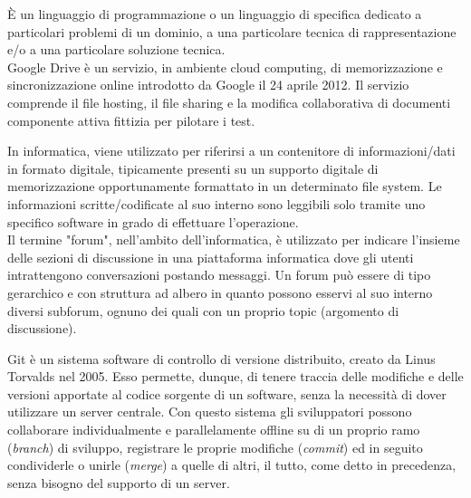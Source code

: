 \documentclass{scalatekids-article}
\begin{document}
 È un linguaggio di programmazione o un linguaggio di specifica dedicato a particolari problemi di un dominio, a una particolare tecnica di rappresentazione e/o a una particolare soluzione tecnica.
\\

 Google Drive è un servizio, in ambiente cloud computing, di memorizzazione e sincronizzazione online introdotto da Google il 24 aprile 2012. Il servizio comprende il file hosting, il file sharing e la modifica collaborativa di documenti
\\

 componente attiva fittizia per pilotare i test.
\\



 In informatica, viene utilizzato per riferirsi a un contenitore di informazioni/dati in formato digitale, tipicamente presenti su un supporto digitale di memorizzazione opportunamente formattato in un determinato file system.
Le informazioni scritte/codificate al suo interno sono leggibili solo tramite uno specifico software in grado di effettuare l'operazione.
\\

 Il termine "forum", nell'ambito dell'informatica, è utilizzato per indicare l'insieme delle sezioni di discussione in una piattaforma informatica dove gli utenti intrattengono conversazioni postando messaggi.
Un forum può essere di tipo gerarchico e con struttura ad albero in quanto possono esservi al suo interno diversi subforum, ognuno dei quali con un proprio topic (argomento di discussione).
\\


 Git è un sistema software di controllo di versione distribuito, creato da Linus Torvalds nel 2005.
Esso permette, dunque, di tenere traccia delle modifiche e delle versioni apportate al codice sorgente di un software, senza la necessità di dover utilizzare un server centrale.
Con questo sistema gli sviluppatori possono collaborare individualmente e parallelamente offline su di un proprio ramo (\textit{branch}) di sviluppo, registrare le proprie modifiche (\textit{commit}) ed in seguito condividerle o unirle (\textit{merge}) a quelle di altri, il tutto, come detto in precedenza, senza bisogno del supporto di un server.
\\
\end{document}
